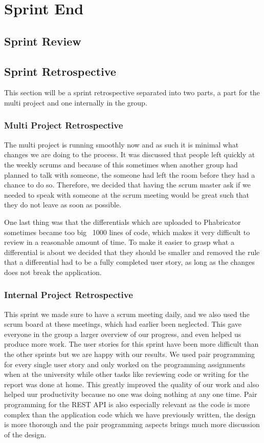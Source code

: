 \chapter{Sprint End}

\section{Sprint Review}\label{sprintreview3}

\section{Sprint Retrospective}
This section will be a sprint retrospective separated into two parts, a part for the multi project and one internally in the group.

\subsection*{Multi Project Retrospective}
The multi project is running smoothly now and as such it is minimal what changes we are doing to the process.
It was discussed that people left quickly at the weekly scrums and because of this sometimes when another group had planned to talk with someone, the someone had left the room before they had a chance to do so.
Therefore, we decided that having the scrum master ask if we needed to speak with someone at the scrum meeting would be great such that they do not leave as soon as possible.

One last thing was that the differentials which are uploaded to Phabricator sometimes became too big ~1000 lines of code, which makes it very difficult to review in a reasonable amount of time.
To make it easier to grasp what a differential is about we decided that they should be smaller and removed the rule that a differential had to be a fully completed user story, as long as the changes does not break the application.

\subsection*{Internal Project Retrospective}
This sprint we made sure to have a scrum meeting daily, and we also used the scrum board at these meetings, which had earlier been neglected.
This gave everyone in the group a larger overview of our progress, and even helped us produce more work.
The user stories for this sprint have been more difficult than the other sprints but we are happy with our results.
We used pair programming for every single user story and only worked on the programming assignments when at the university while other tasks like reviewing code or writing for the report was done at home.
This greatly improved the quality of our work and also helped uur productivity because no one was doing nothing at any one time.
Pair programming for the REST API is also especially relevant as the code is more complex than the application code which we have previously written, the design is more thorough and the pair programming aspects brings much more discussion of the design.

